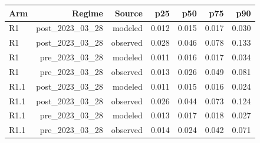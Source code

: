 \begin{tabular}{lrrrrrr}
\toprule
Arm & Regime & Source & p25 & p50 & p75 & p90 \\
\midrule
R1 & post\_2023\_03\_28 & modeled & 0.012 & 0.015 & 0.017 & 0.030 \\
R1 & post\_2023\_03\_28 & observed & 0.028 & 0.046 & 0.078 & 0.133 \\
R1 & pre\_2023\_03\_28 & modeled & 0.011 & 0.016 & 0.017 & 0.034 \\
R1 & pre\_2023\_03\_28 & observed & 0.013 & 0.026 & 0.049 & 0.081 \\
R1.1 & post\_2023\_03\_28 & modeled & 0.011 & 0.015 & 0.016 & 0.024 \\
R1.1 & post\_2023\_03\_28 & observed & 0.026 & 0.044 & 0.073 & 0.124 \\
R1.1 & pre\_2023\_03\_28 & modeled & 0.013 & 0.017 & 0.018 & 0.027 \\
R1.1 & pre\_2023\_03\_28 & observed & 0.014 & 0.024 & 0.042 & 0.071 \\
\bottomrule
\end{tabular}
